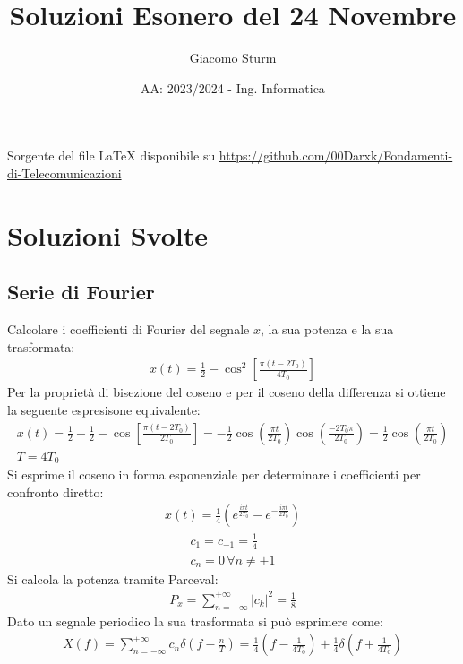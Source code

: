 \documentclass{article}
\title{Soluzioni Esonero del 24 Novembre}
\author{Giacomo Sturm}
\date{AA: 2023/2024 - Ing. Informatica}
\begin{document}

\pagestyle{fancy}
\fancyhead{}\fancyfoot{}
\fancyfoot[C]{\thepage}

\maketitle

\vspace{10mm}

\begin{center}
    Sorgente del file LaTeX disponibile su \url{https://github.com/00Darxk/Fondamenti-di-Telecomunicazioni}
\end{center}

\clearpage

\tableofcontents

\clearpage


\section{Soluzioni Svolte}

\subsection{Serie di Fourier}
Calcolare i coefficienti di Fourier del segnale $x$, la sua potenza e la sua trasformata:
\begin{gather*}
    x(t)=\displaystyle\frac{1}{2}-\cos^2\left[\frac{\pi(t-2T_0)}{4T_0}\right]
\end{gather*}
Per la proprietà di bisezione del coseno e per il coseno della differenza si ottiene la seguente espresisone equivalente:
\begin{gather*}
    x(t)=\displaystyle\frac{1}{2}-\frac{1}{2}-\cos\left[\frac{\pi(t-2T_0)}{2T_0}\right]=-\frac{1}{2}\cos\left(\frac{\pi t}{2T_0}\right)\cos\left(\frac{-2T_0\pi}{2T_0}\right)=\frac{1}{2}\cos\left(\frac{\pi t}{2T_0}\right)\\
    T=4T_0
\end{gather*}
Si esprime il coseno in forma esponenziale per determinare i coefficienti per confronto diretto:
\begin{gather*}
    x(t)=\displaystyle\frac{1}{4}\left(e^{\frac{i\pi t}{2T_0}}-e^{-\frac{i\pi t}{2T_0}}\right)
\end{gather*}
\begin{gather}
    c_1=c_{-1}=\displaystyle\frac{1}{4}\\
    c_n=0\,\forall n\neq\pm1
\end{gather}
Si calcola la potenza tramite Parceval:
\begin{gather}
    P_x=\displaystyle\sum_{n=-\infty}^{+\infty}|c_k|^2=\frac{1}{8}
\end{gather}
Dato un segnale periodico la sua trasformata si può esprimere come:
\begin{gather}
    X(f)=\displaystyle\sum_{n=-\infty}^{+\infty}c_n\delta\left(f-\frac{n}{T}\right)=\frac{1}{4}\left(f-\frac{1}{4T_0}\right)+\frac{1}{4}\delta\left(f+\frac{1}{4T_0}\right)
\end{gather}
\end{document}
